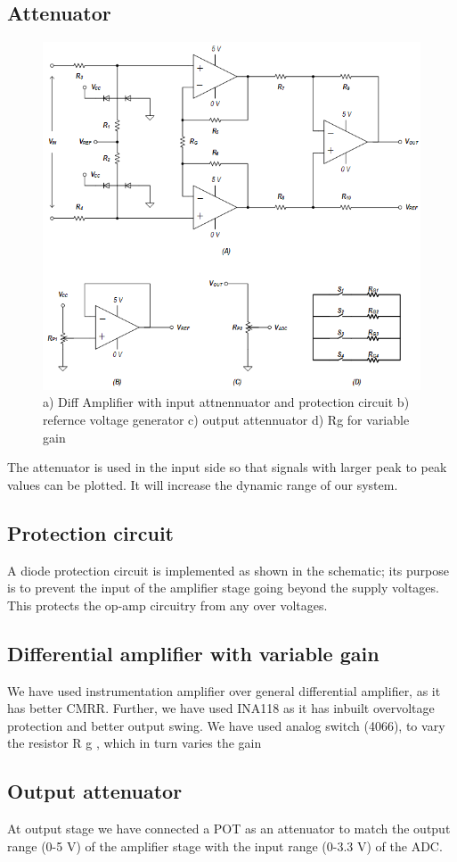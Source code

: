 \documentclass{article}
\begin{document}
	\subsection{Attenuator}
	\begin{figure}
		\centering
		\includegraphics[width=0.7\linewidth]{Schmatic1}
		\caption{a) Diff Amplifier with input attnennuator and protection circuit b) refernce voltage generator c) output attennuator d) Rg for variable gain}
		\label{fig:schmatic1}
	\end{figure}
	
	The attenuator is used in the input side so that signals with larger peak to
	peak values can be plotted. It will increase the dynamic range of our system.
	\subsection{Protection circuit}
	A diode protection circuit is implemented as shown in the schematic; its purpose
	is to prevent the input of the amplifier stage going beyond the supply voltages. This
	protects the op-amp circuitry from any over voltages.
	\subsection{Differential amplifier with variable gain}
	We have used instrumentation amplifier over general differential amplifier, as
	it has better CMRR. Further, we have used INA118 as it has inbuilt overvoltage
	protection and better output swing.
	We have used analog switch (4066), to vary the resistor R g , which in turn
	varies the gain
	\subsection{Output attenuator}
	At output stage we have connected a POT as an attenuator to match the
	output range (0-5 V) of the amplifier stage with the input range (0-3.3 V) of the ADC.
	
\end{document}
